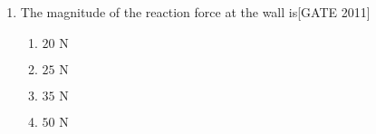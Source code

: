 \documentclass[journal,12pt,onecolumn]{IEEEtran}
\theoremstyle{remark}
\begin{document}
\begin{enumerate}
\item The magnitude of the reaction force at the wall is\hfill{[GATE 2011]}
    \begin{multicols}{4}
        \begin{enumerate}
            \item $20  \text{ N}$
            \item $25  \text{ N}$
            \item $35  \text{ N}$
            \item $50  \text{ N}$
        \end{enumerate}
    \end{multicols}
\end{enumerate}
\end{document}
